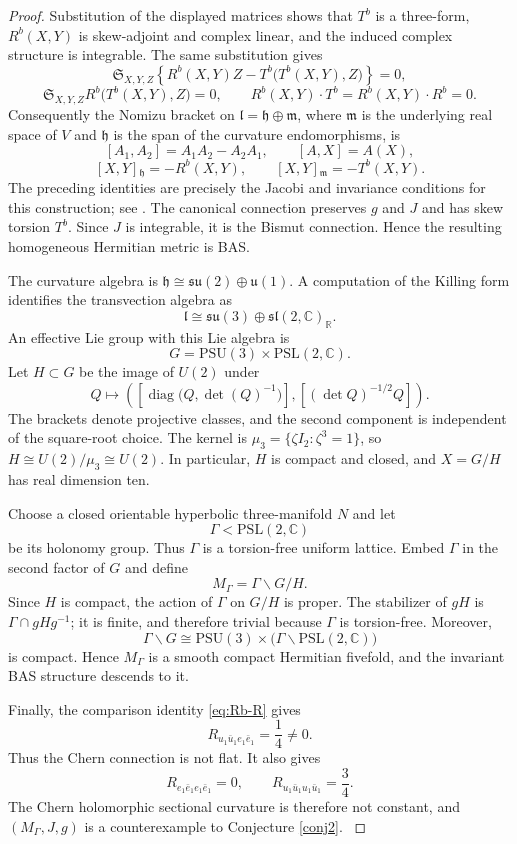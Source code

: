 \documentclass{amsart}
\newcommand{\R}{{\mathbb R}}
\newcommand{\C}{{\mathbb C}}
\begin{document}
\begin{proof}
{Substitution of the displayed matrices shows that $T^b$ is a three-form,
$R^b(X,Y)$ is skew-adjoint and complex linear, and the induced complex
structure is integrable. The same substitution gives
}\[
{\mathfrak S_{X,Y,Z}
 \left\{R^b(X,Y)Z-T^b\bigl(T^b(X,Y),Z\bigr)\right\}=0,
}\]
\[
{\mathfrak S_{X,Y,Z}R^b\bigl(T^b(X,Y),Z\bigr)=0,
\qquad
 R^b(X,Y)\cdot T^b=R^b(X,Y)\cdot R^b=0.
}\]
{Consequently the Nomizu bracket on
$\mathfrak l=\mathfrak h\oplus\mathfrak m$, where
$\mathfrak m$ is the underlying real space of $V$ and $\mathfrak h$ is the
span of the curvature endomorphisms, is
}\[
 [{A_1,A_2}]{=A_1A_2-A_2A_1,\qquad }[{A,X}]{=A(X),
}\]
\[
 [{X,Y}]{_{\mathfrak h}=-R^b(X,Y),\qquad
 }[{X,Y}]{_{\mathfrak m}=-T^b(X,Y).
}\]
{The preceding identities are precisely the Jacobi and invariance conditions
for this construction; see \cite[Theorem 3.7]{BarbaroP}. The canonical
connection preserves} $g$ {and $J$ and has skew torsion $T^b$. Since $J$ is
integrable, it is the Bismut connection. Hence the resulting homogeneous
Hermitian metric is BAS.
}

{The curvature algebra is
$\mathfrak h\cong\mathfrak{su}(2)\oplus\mathfrak u(1)$. A computation of the
Killing form identifies the transvection algebra as
}\[
 {\mathfrak l\cong
 \mathfrak{su}(3)\oplus\mathfrak{sl}(2,\C)_{\R}.
}\]
{An effective Lie group with this Lie algebra is
}\[
{G=\mathrm{PSU}(3)\times\mathrm{PSL}(2,\C).
}\]
{Let $H\subset G$ be the image of $U(2)$ under
}\[
{Q\longmapsto
 \left(
  \left[\operatorname{diag}\bigl(Q,\det(Q)^{-1}\bigr)\right],
  \left[(\det Q)^{-1/2}Q\right]
 \right).
}\]
{The brackets denote projective classes, and the second component is
independent of the square-root choice. The kernel is
$\mu_3=\{\zeta I_2:\zeta^3=1\}$, so
$H\cong U(2)/\mu_3\cong U(2)$. } In particular, {$H$ is compact and closed,
and $X=G/H$ has real dimension ten.
}

{Choose a closed orientable hyperbolic three-manifold $N$ and let
}\[
{\Gamma<\mathrm{PSL}(2,\C)
}\]
{be its holonomy group. Thus $\Gamma$ is a torsion-free uniform lattice.
Embed $\Gamma$ in the second factor of $G$ and define
}\[
{M_\Gamma=\Gamma\backslash G/H.
}\]
{Since $H$ is compact, the action of $\Gamma$ on $G/H$ is proper. The
stabilizer of $gH$ is $\Gamma\cap gHg^{-1}$; it is finite, and therefore
trivial because $\Gamma$ is torsion-free. Moreover,
}\[
{\Gamma\backslash G
 \cong\mathrm{PSU}(3)\times
       \bigl(\Gamma\backslash\mathrm{PSL}(2,\C)\bigr)
}\]
{is compact. Hence $M_\Gamma$ is a smooth compact Hermitian fivefold, and
the invariant BAS structure descends to it.
}

{Finally, the comparison identity \eqref{eq:Rb-R} gives
}\[
{R_{u_1\bar u_1e_1\bar e_1}=\frac{1}{4}\ne0.
}\]
{Thus the Chern connection is not flat. It also gives
}\[
{R_{e_1\bar e_1e_1\bar e_1}=0,\qquad
 R_{u_1\bar u_1u_1\bar u_1}=\frac{3}{4}.
}\]
{The Chern holomorphic sectional curvature is therefore not constant, and
$(M_\Gamma,J,g)$ is a counterexample to Conjecture \ref{conj2}.
}\end{proof}
\end{document}
